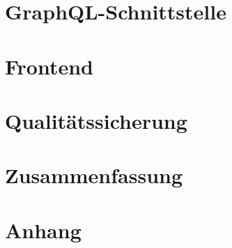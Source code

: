 \documentclass[a4paper,12pt,oneside]{article}
\begin{document}
\newpage
\section{GraphQL-Schnittstelle}\label{kap_Schnittstelle}


\newpage
\section{Frontend}\label{kap_Frontend}


\newpage
\section{Qualitätssicherung }\label{kap_QS}


\newpage
\section*{Zusammenfassung }\label{kap_ZF}




\newpage
\section*{Anhang}\label{anhang}


\newpage
\printbibliography[heading=bibintoc]

\pagestyle{empty}
\end{document}
